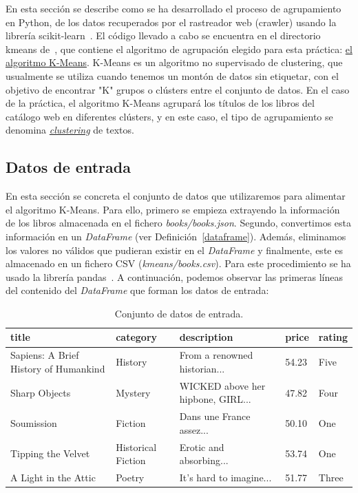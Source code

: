 \documentclass{uimppracticas}
\begin{document}
En esta sección se describe como se ha desarrollado el proceso de agrupamiento en Python, de los datos recuperados por el rastreador web (crawler) usando la librería scikit-learn~\cite{scikit-learn}. El código llevado a cabo se encuentra en el directorio kmeans de~\cite{GitHubRepo}, que contiene el algoritmo de agrupación elegido para esta práctica:  \href{https://scikit-learn.org/stable/modules/generated/sklearn.cluster.KMeans.html}{el algoritmo K-Means}. K-Means es un algoritmo no supervisado de clustering, que usualmente se utiliza cuando tenemos un montón de datos sin etiquetar, con el objetivo de encontrar "K" grupos o clústers entre el conjunto de datos. En el caso de la práctica, el algoritmo K-Means agrupará los títulos de los libros del catálogo web en diferentes clústers, y en este caso, el tipo de agrupamiento se denomina \href{https://en.wikipedia.org/wiki/Document_clustering}{\textit{clustering}} de textos.

\subsection{Datos de entrada}

En esta sección se concreta el conjunto de datos que utilizaremos para alimentar el algoritmo K-Means. Para ello, primero se empieza extrayendo la información de los libros almacenada en el fichero \textit{books/books.json}. Segundo, convertimos esta información en un \textit{DataFrame} (ver Definición~\ref{dataframe}). Además, eliminamos los valores no válidos que pudieran existir en el \textit{DataFrame} y finalmente, este es almacenado en un fichero CSV (\textit{kmeans/books.csv}). Para este procedimiento se ha usado la librería pandas~\cite{jeff_reback_2020_4309786}. A continuación, podemos observar las primeras líneas del contenido del \textit{DataFrame} que forman los datos de entrada:

\begin{table}[h]
	\begin{adjustbox}{width=\columnwidth,center}
		\begin{tabular}{lllll}
			\toprule
			title & category & description & price & rating \\
			\midrule
			Sapiens: A Brief History of Humankind & History & From a renowned historian... & 54.23 & Five \\
			Sharp Objects & Mystery & WICKED above her hipbone, GIRL... & 47.82 & Four \\
			Soumission & Fiction & Dans une France assez... & 50.10 & One \\
			Tipping the Velvet & Historical Fiction & Erotic and absorbing... & 53.74 & One \\
			A Light in the Attic & Poetry & It's hard to imagine... & 51.77 & Three \\
			\bottomrule
		\end{tabular}
	\end{adjustbox}
	\caption{Conjunto de datos de entrada.}
	\label{table1}
\end{table}
\end{document}

